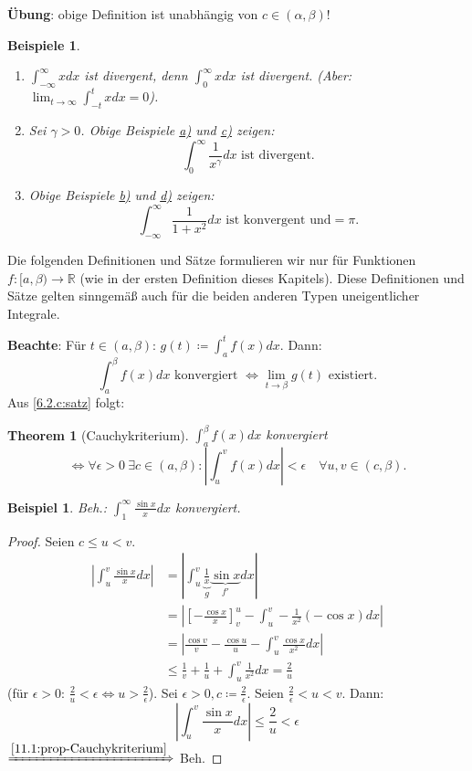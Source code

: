 \documentclass{extreport}
\newcommand{\R}{\mathbb{R}}
\theoremstyle{named}
\newtheorem{namedtheorem}{Theorem} \counterwithin{namedtheorem}{chapter}
\theoremstyle{dotless}
\newtheorem*{beispiel*}{Beispiel}
\newtheorem*{beispiele}{Beispiele}
\begin{document}
\textbf{Übung}: obige Definition ist unabhängig von $c \in (\alpha, \beta)$!

\begin{beispiele} ~\
	\begin{enumerate}
		\item $\int_{-\infty}^{\infty} x dx$ ist divergent, denn $\int_{0}^{\infty} x dx$ ist divergent. (Aber: $\lim_{t \rightarrow \infty} \int_{-t}^{t} x dx = 0$).
		\item Sei $\gamma > 0$. Obige Beispiele \hyperref[11.0:bsp-obigeBspa]{a)} und \hyperref[11.0:bsp-obigeBspc]{c)} zeigen:
			$$ \int_{0}^{\infty} \frac{1}{x^{\gamma}} dx \text{ ist divergent.} $$
		\item Obige Beispiele \hyperref[11.0:bsp-obigeBspb]{b)} und \hyperref[11.0:bsp-obigeBspd]{d)} zeigen:
			$$ \int_{-\infty}^{\infty} \frac{1}{1 + x^{2}} dx \text{ ist konvergent und} = \pi. $$
	\end{enumerate}
\end{beispiele}

Die folgenden Definitionen und Sätze formulieren wir nur für Funktionen $f \colon [a, \beta) \rightarrow \R$ (wie in der ersten Definition dieses Kapitels). Diese Definitionen und Sätze gelten sinngemä{\ss} auch für die beiden anderen Typen uneigentlicher Integrale.

\textbf{Beachte}: Für $t \in (a, \beta)$: $g(t) \coloneqq \int_{a}^{t} f(x) dx$. Dann:
	$$ \int_{a}^{\beta} f(x) dx \text{ konvergiert } \iff \lim_{t \rightarrow \beta} g(t) \text{ existiert.} $$
Aus \ref{6.2.c:satz} folgt:

\begin{namedtheorem}[Cauchykriterium] \label{11.1:prop-Cauchykriterium}
	$\int_{a}^{\beta} f(x) dx$ konvergiert
	$$ \iff \forall \epsilon > 0 ~\exists c \in (a, \beta):  | \int_{u}^{v} f(x) dx | < \epsilon \quad \forall u, v \in (c, \beta).  $$
\end{namedtheorem}


\begin{beispiel*}
	Beh.: $\int_{1}^{\infty} \frac{\sin x}{x} dx$ konvergiert.	
\end{beispiel*}

\begin{proof}
	Seien $c \leq u < v$.
	\begin{align*}
		|\int_{u}^{v} \frac{\sin x}{x} dx | & = | \int_{u}^{v} \underbrace{\frac{1}{x}}_{g} \underbrace{\sin x}_{f'} dx | \\
			& = | \left[ -\frac{\cos x}{x} \right]_{v}^{u} - \int_{u}^{v} - \frac{1}{x^{2}} (-\cos x) dx | \\
			& = | \frac{\cos v}{v} - \frac{\cos u}{u} - \int_{u}^{v} \frac{\cos x}{x^{2}} dx | \\
			& \leq \frac{1}{v} + \frac{1}{u} + \int_{u}^{v} \frac{1}{x^{2}} dx = \frac{2}{u}
	\end{align*}
	(für $\epsilon > 0$: $\frac{2}{u} < \epsilon \iff u > \frac{2}{\epsilon}$). Sei $\epsilon > 0, c \coloneqq \frac{2}{\epsilon}$. Seien $\frac{2}{\epsilon} < u < v$. Dann:
	$$ | \int_{u}^{v} \frac{\sin x}{x} dx | \leq \frac{2}{u} < \epsilon $$
	$\xRightarrow[]{\ref{11.1:prop-Cauchykriterium}}$ Beh.
\end{proof}
\end{document}
